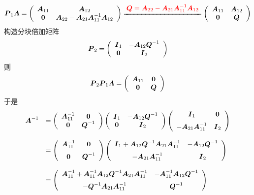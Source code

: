\begin{jie}[续]
  $$
  \MP_1\MA = \left(
    \begin{array}{cc}
      \MA_{11} & \MA_{12} \\
      \M0 & \MA_{22}-\MA_{21}\MA_{11}^{-1}\MA_{12}
    \end{array}
  \right)\xlongequal[]{\red{\ds \MQ=\MA_{22}-\MA_{21}\MA_{11}^{-1}\MA_{12}}}
  \left(
    \begin{array}{cc}
      \MA_{11} & \MA_{12} \\
      \M0 & \MQ
    \end{array}
  \right)
  $$ 
  构造分块倍加矩阵
  $$
  \MP_2 = \left(
    \begin{array}{cc}
      \MI_1 & -\MA_{12}\MQ^{-1}\\
      \M0 & \MI_2
    \end{array}
  \right)
  $$ 
  则
  $$
  \MP_2\MP_1\MA = \left(
    \begin{array}{cc}
      \MA_{11} & \M0\\
      \M0 & \MQ
    \end{array}
  \right)
  $$ 
  于是
  $$
  \begin{array}{rl}
    \MA^{-1} & = \left(
      \begin{array}{cc}
        \MA_{11}^{-1} & \M0\\
        \M0 & \MQ^{-1}
      \end{array}
    \right)\left(
      \begin{array}{cc}
        \MI_1 & -\MA_{12}\MQ^{-1}\\
        \M0 & \MI_2
      \end{array}
    \right)\left(
      \begin{array}{cc}
        \MI_1 & \M0\\[0.2cm]
        -\MA_{21}\MA_{11}^{-1} & \MI_2
      \end{array}
    \right) \\[0.3in]
    & = \left(
      \begin{array}{cc}
        \MA_{11}^{-1} & \M0\\[0.2cm]
        \M0 & \MQ^{-1}
      \end{array}
    \right)\left(
      \begin{array}{cc}
        \MI_1+ \MA_{12}\MQ^{-1}\MA_{21}\MA_{11}^{-1}& -\MA_{12}\MQ^{-1}\\[0.2cm]
        -\MA_{21}\MA_{11}^{-1} & \MI_2
      \end{array}
    \right)\\[0.3in]
    & = \left(
      \begin{array}{cc}
        \MA_{11}^{-1}+ \MA_{11}^{-1}\MA_{12}\MQ^{-1}\MA_{21}\MA_{11}^{-1}& -\MA_{11}^{-1}\MA_{12}\MQ^{-1}\\[0.2cm]
        -\MQ^{-1}\MA_{21}\MA_{11}^{-1} & \MQ^{-1}
      \end{array}
    \right)
  \end{array}
  $$
\end{jie}




